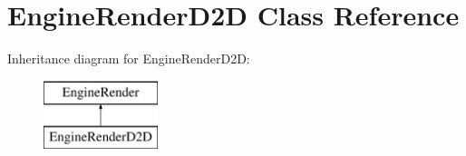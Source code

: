 \hypertarget{class_engine_render_d2_d}{\section{Engine\-Render\-D2\-D Class Reference}
\label{class_engine_render_d2_d}
}
Inheritance diagram for Engine\-Render\-D2\-D\-:\begin{figure}[H]
\begin{center}
\leavevmode
\includegraphics[height=2.000000cm]{class_engine_render_d2_d}
\end{center}
\end{figure}
